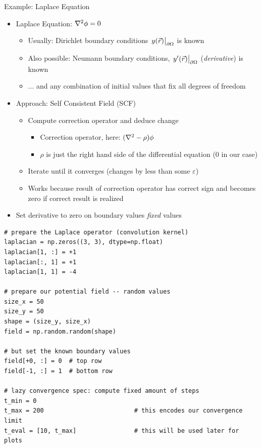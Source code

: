 \begin{frame}[fragile]{Example: Laplace Equation}
%
\begin{itemize}
\item Laplace Equation: $\laplacian \phi = 0$
	\begin{itemize}
	\item Usually: Dirichlet boundary conditions $\eval{y(\vec{r})}_{\partial\Omega}$ is known
	\item Also possible: Neumann boundary conditions, $\eval{y'(\vec{r})}_{\partial\Omega}$ (\emph{derivative}) is known
	\item ... and any combination of initial values that fix all degrees of freedom
	\end{itemize}
\item Approach: Self Consistent Field (SCF)
	\begin{itemize}
	\item Compute correction operator and deduce change
		\begin{itemize}
		\item Correction operator, here: $(\laplacian - \rho)\phi$
		\item $\rho$ is just the right hand side of the differential equation (\ie $0$ in our case)
		\end{itemize}
	\item Iterate until it converges (changes by less than some $\varepsilon$)
	\item Works because result of correction operator has correct sign and becomes zero if correct result is realized
	\end{itemize}
\item Set derivative to zero on boundary values \Thus \emph{fixed} values
\end{itemize}
%
\end{frame}


\begin{frame}[fragile]
%
\begin{codebox}
\begin{verbatim}
# prepare the Laplace operator (convolution kernel)
laplacian = np.zeros((3, 3), dtype=np.float)
laplacian[1, :] = +1
laplacian[:, 1] = +1
laplacian[1, 1] = -4

# prepare our potential field -- random values
size_x = 50
size_y = 50
shape = (size_y, size_x)
field = np.random.random(shape)

# but set the known boundary values
field[+0, :] = 0  # top row
field[-1, :] = 1  # bottom row

# lazy convergence spec: compute fixed amount of steps
t_min = 0
t_max = 200                         # this encodes our convergence limit
t_eval = [10, t_max]                # this will be used later for plots
\end{verbatim}
\end{codebox}
%
\end{frame}

